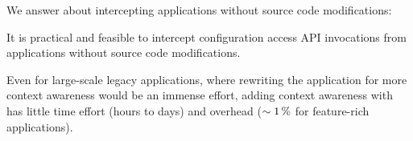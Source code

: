 We answer  about intercepting applications without source code modifications:
\rqUnmodified*

\begin{finding}
It is practical and feasible to intercept configuration access API invocations from applications without source code modifications.

Even for large-scale legacy applications, where rewriting the application for more context awareness would be an immense effort, adding context awareness with \elektra{} has little time effort (hours to days) and overhead ($\sim\SI{1}{\percent}$ for feature-rich applications).
\end{finding}
